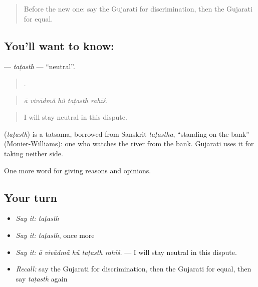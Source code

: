 \label{lesson:GU-C349-tatasth}



\begin{quote}
Before the new one: say the Gujarati for discrimination, then the Gujarati for equal.
\end{quote}

\subsection*{You'll want to know: }
\textbf{} — \emph{taṭasth} — \textquotedblleft{}neutral\textquotedblright{}.

\begin{quote}
    .
\end{quote}

\begin{quote}
\emph{ā vivādmā̃ hũ taṭasth rahīś.}
\end{quote}

\begin{quote}
I will stay neutral in this dispute.
\end{quote}

\begin{cousinweb}
\textbf{} (\emph{taṭasth}) is a tatsama, borrowed from Sanskrit \emph{taṭastha}, \textquotedblleft{}standing on the bank\textquotedblright{} (Monier-Williams): one who watches the river from the bank. Gujarati uses it for taking neither side.
\end{cousinweb}

\begin{grammarlens}[title={What you've built}]
One more word for giving reasons and opinions.
\end{grammarlens}

\subsection*{Your turn}
\begin{itemize}
\raggedright
  \item \emph{Say it:} \emph{taṭasth}
  \item \emph{Say it:} \emph{taṭasth}, once more
  \item \emph{Say it:} \emph{ā vivādmā̃ hũ taṭasth rahīś.} — I will stay neutral in this dispute.
  \item \emph{Recall:} say the Gujarati for discrimination, then the Gujarati for equal, then say \emph{taṭasth} again
\end{itemize}

